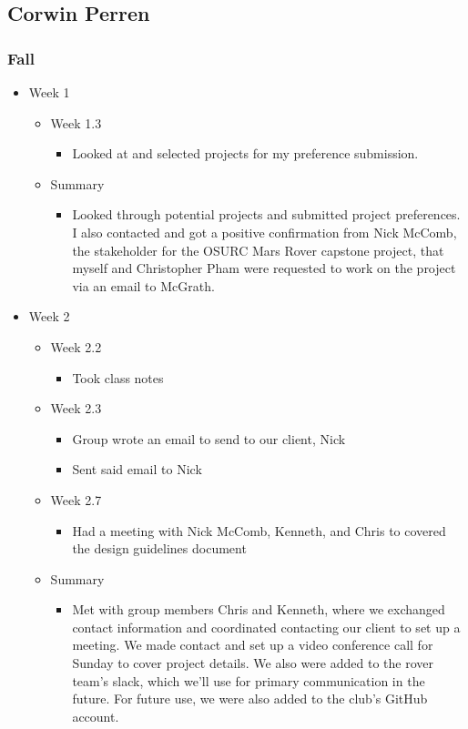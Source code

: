 \subsection{Corwin Perren}
\subsubsection{Fall}
\begin{itemize}
\item Week 1
	\begin{itemize}
	\item Week 1.3
      \begin{itemize}
      \item Looked at and selected projects for my preference submission. 
      \end{itemize}
    
    \item Summary
      \begin{itemize}
      \item Looked through potential projects and submitted project preferences. I also contacted and got a positive confirmation from Nick McComb, the stakeholder for the OSURC Mars Rover capstone project, that myself and Christopher Pham were requested to work on the project via an email to McGrath.  
      \end{itemize}
	\end{itemize}

\item Week 2
	\begin{itemize}
	\item Week 2.2
      \begin{itemize}
      \item Took class notes
      \end{itemize}
	\item Week 2.3
      \begin{itemize}
      \item Group wrote an email to send to our client, Nick
      \item Sent said email to Nick 
      \end{itemize}
	\item Week 2.7
      \begin{itemize}
      \item Had a meeting with Nick McComb, Kenneth, and Chris to covered the design guidelines document 
      \end{itemize}
    
    \item Summary
      \begin{itemize}
      \item Met with group members Chris and Kenneth, where we exchanged contact information and coordinated contacting our client to set up a meeting. We made contact and set up a video conference call for Sunday to cover project details. We also were added to the rover team's slack, which we'll use for primary communication in the future. For future use, we were also added to the club's GitHub account. 
      \end{itemize}
	\end{itemize}


\end{itemize}
